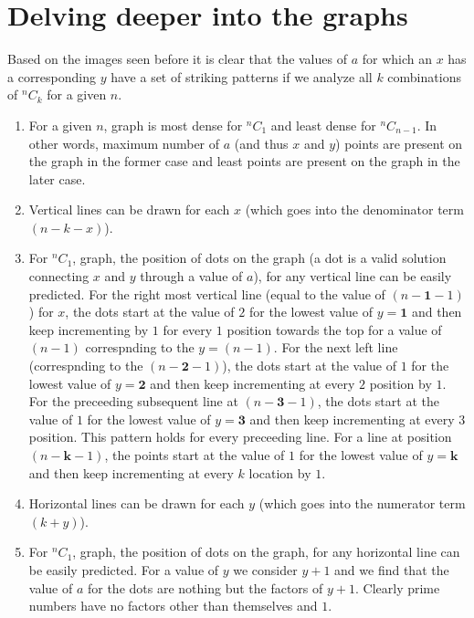 \documentclass[10pt, twoside]{article}
\newcommand*{\Combination}[2]{{}^{#1}C_{#2}}%
\begin{document}
\section{Delving deeper into the graphs}\label{Implications}
Based on the images seen before it is clear that the values of $a$ for which an $x$ has a corresponding $y$ have a set of striking patterns if we analyze all $k$ combinations of $\Combination{n}{k}$ for a given $n$. 
\begin{enumerate}
	\item For a given $n$, graph is most dense for $\Combination{n}{1}$ and least dense for $\Combination{n}{n-1}$. In other words, maximum number of $a$ (and thus $x$ and $y$) points are present on the graph in the former case and least points are present on the graph in the later case.
	\item Vertical lines can be drawn for each $x$ (which goes into the denominator term $(n-k-x)$). 
	\item For $\Combination{n}{1}$, graph, the position of dots on the graph (a dot is a valid solution connecting $x$ and $y$ through a value of $a$), for any vertical line can be easily predicted. For the right most vertical line (equal to the value of $(n-\textbf{1}-1)$) for $x$, the dots start at the value of $2$ for the lowest value of $y=\textbf{1}$ and then keep incrementing by $1$ for every \textbf{$1$} position towards the top for a value of $(n-1)$ correspnding to the $y=(n-1)$. For the next left line (correspnding to the $(n-\textbf{2}-1)$), the dots start at the value of $1$ for the lowest value of $y=\textbf{2}$ and then keep incrementing at every \textbf{$2$} position by $1$. For the preceeding subsequent line at $(n-\textbf{3}-1)$, the dots start at the value of $1$ for the lowest value of $y=\textbf{3}$ and then keep incrementing at every \textbf{$3$} position. This pattern holds for every preceeding line. For a line at position $(n-\textbf{k}-1)$, the points start at the value of $1$ for the lowest value of $y=\textbf{k}$ and then keep incrementing at every \textbf{$k$} location by $1$.
	\item Horizontal lines can be drawn for each $y$ (which goes into the numerator term $(k+y)$).
	\item For $\Combination{n}{1}$, graph, the position of dots on the graph, for any horizontal line can be easily predicted. For a value of $y$ we consider $y+1$ and we find that the value of $a$ for the dots are nothing but the factors of $y+1$. Clearly prime numbers have no factors other than themselves and $1$.

\end{enumerate}
\end{document}
